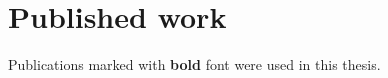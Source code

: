 \chapter{Published work}

Publications marked with \textbf{bold} font were used in this thesis.

\begin{refsection}
\nocite{parallelintime,tn,bruteforce,railwaydispatching,omnisolver,pyqbench,igarss}
\printbibliography[heading=none]
\end{refsection}

